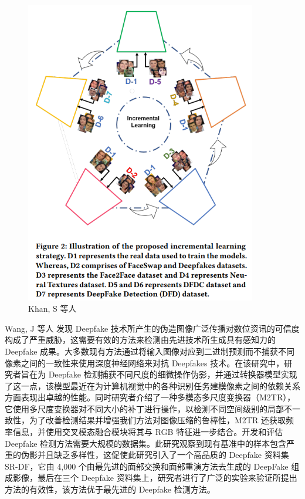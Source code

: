 \begin{figure}[htb]
\centering 
\includegraphics[width=0.90\textwidth]{img/ch4m14.png} 
\caption{Khan, S 等人 \cite{khan2021video}}
\label{Test}
\end{figure}

Wang, J 等人 \cite{wang2021m2tr} 发现 Deepfake 技术所产生的伪造图像广泛传播对数位资讯的可信度构成了严重威胁，这需要有效的方法来检测由先进技术所生成具有感知力的 Deepfake 成果。大多数现有方法通过将输入图像对应到二进制预测而不捕获不同像素之间的一致性来使用深度神经网络来对抗 Deepfakes 技术。在该研究中，研究者旨在为 Deepfake 检测捕获不同尺度的细微操作伪影，并通过转换器模型实现了这一点，该模型最近在为计算机视觉中的各种识别任务建模像素之间的依赖关系方面表现出卓越的性能。同时研究者介绍了一种多模态多尺度变换器（M2TR），它使用多尺度变换器对不同大小的补丁进行操作，以检测不同空间级别的局部不一致性，为了改善检测结果并增强我们方法对图像压缩的鲁棒性，M2TR 还获取频率信息，并使用交叉模态融合模块将其与 RGB 特征进一步结合。开发和评估 Deepfake 检测方法需要大规模的数据集。此研究观察到现有基准中的样本包含严重的伪影并且缺乏多样性，这促使此研究引入了一个高品质的 Deepfake 资料集 SR-DF，它由 4,000 个由最先进的面部交换和面部重演方法去生成的 DeepFake 组成影像，最后在三个 Deepfake 资料集上，研究者进行了广泛的实验来验证所提出方法的有效性，该方法优于最先进的 Deepfake 检测方法。

